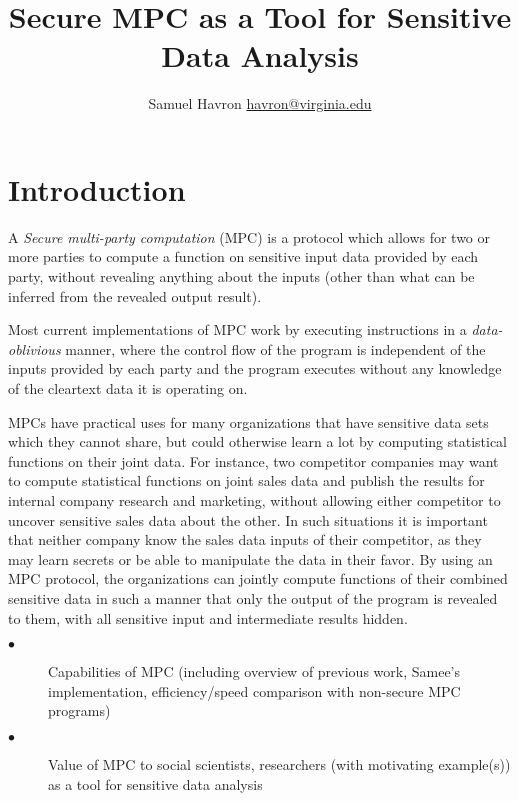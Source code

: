 \documentclass{article}
\author{Samuel Havron \textlangle{}\href{mailto:havron@virginia.edu}{havron@virginia.edu}\textrangle{}}
\title{\textbf{Secure MPC as a Tool for Sensitive Data Analysis}}
\begin{document}
\maketitle
\section{Introduction}
A \emph{Secure multi-party computation} (MPC) is a protocol which allows for two or more parties to compute a function on sensitive input data provided by each party, without revealing anything about the inputs (other than what can be inferred from the revealed output result). 

Most current implementations of MPC work by executing instructions in a \emph{data-oblivious} manner, where the control flow of the program is independent of the inputs provided by each party and the program executes without any knowledge of the cleartext data it is operating on.  %

MPCs have practical uses for many organizations that have sensitive data sets which they cannot share, but could otherwise learn a lot by computing statistical functions on their joint data.  For instance, two competitor companies may want to compute statistical functions on joint sales data and publish the results for internal company research and marketing, without allowing either competitor to uncover sensitive sales data about the other. In such situations it is important that neither company know the sales data inputs of their competitor, as they may learn secrets or be able to manipulate the data in their favor. By using an MPC protocol, the organizations can jointly compute functions of their combined sensitive data in such a manner that only the output of the program is revealed to them, with all sensitive input and intermediate results hidden. 


\begin{description}
\item[$\bullet$] Capabilities of MPC (including overview of previous work, Samee's implementation, efficiency/speed comparison with non-secure MPC programs) 
\item[$\bullet$] Value of MPC to social scientists, researchers (with motivating example(s)) as a tool for sensitive data analysis
\end{description}
\end{document}
